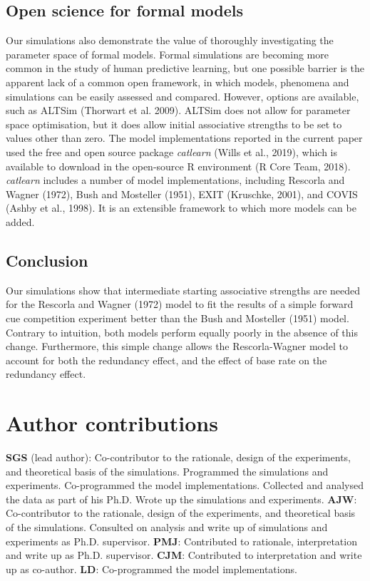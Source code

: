 \documentclass[twocolumn]{article}
\begin{document}
\subsection{Open science for formal models}

Our simulations also
demonstrate the value of thoroughly investigating the parameter space of
formal models. Formal simulations are becoming more common in the study
of human predictive learning, but one possible barrier is the apparent
lack of a common open framework, in which models, phenomena and
simulations can be easily assessed and compared. However, options are
available, such as ALTSim (Thorwart et al. 2009). ALTSim does not allow
for parameter space optimisation, but it does allow initial associative
strengths to be set to values other than zero. The model implementations
reported in the current paper used the free and open source package
\emph{catlearn }(Wills et al., 2019), which is available to download in
the open-source R environment (R Core Team, 2018). \emph{catlearn}
includes a number of model implementations, including Rescorla and
Wagner (1972), Bush and Mosteller (1951), EXIT (Kruschke, 2001), and
COVIS (Ashby et al., 1998). It is an extensible framework to which more
models can be added.

\subsection{Conclusion}

Our simulations show that intermediate starting
associative strengths are needed for the Rescorla and Wagner (1972)
model to fit the results of a simple forward cue competition experiment
better than the Bush and Mosteller (1951) model. Contrary to intuition,
both models perform equally poorly in the absence of this change.
Furthermore, this simple change allows the Rescorla-Wagner model to
account for both the redundancy effect, and the effect of base rate on
the redundancy effect.

\section*{Author contributions}

\textbf{SGS} (lead author): Co-contributor to the rationale, design of the
experiments, and theoretical basis of the simulations. Programmed the
simulations and experiments. Co-programmed the model implementations. Collected
and analysed the data as part of his Ph.D.  Wrote up the simulations and
experiments. \textbf{AJW}: Co-contributor to the rationale, design of the
experiments, and theoretical basis of the simulations. Consulted on analysis
and write up of simulations and experiments as Ph.D.  supervisor.
\textbf{PMJ}: Contributed to rationale, interpretation and write up as
Ph.D. supervisor.
\textbf{CJM}: Contributed to interpretation and write up as
co-author.
\textbf{LD}: Co-programmed the model implementations.
\end{document}
